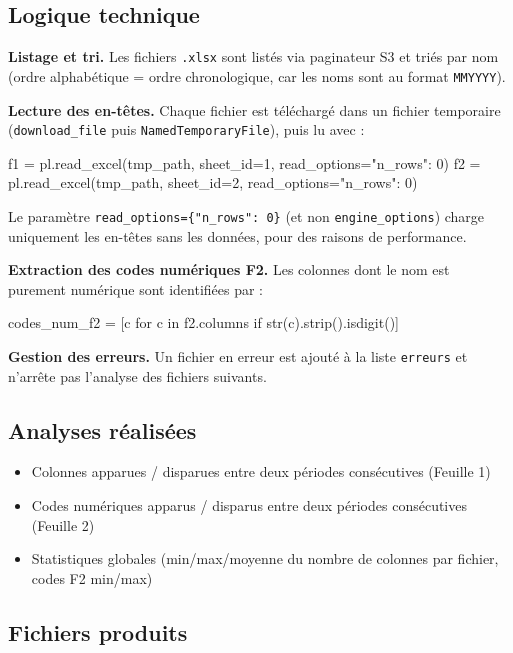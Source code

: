 \documentclass[12pt,a4paper,french]{report}
\begin{document}
\subsection{Logique technique}

\textbf{Listage et tri.} Les fichiers \texttt{.xlsx} sont listés via
paginateur S3 et triés par nom (ordre alphabétique = ordre chronologique,
car les noms sont au format \texttt{MMYYYY}).

\textbf{Lecture des en-têtes.} Chaque fichier est téléchargé dans un fichier
temporaire (\texttt{download\_file} puis \texttt{NamedTemporaryFile}), puis lu
avec :

\begin{codebox}[]
f1 = pl.read\_excel(tmp\_path, sheet\_id=1, read\_options={"n\_rows": 0})
f2 = pl.read\_excel(tmp\_path, sheet\_id=2, read\_options={"n\_rows": 0})
\end{codebox}

Le paramètre \texttt{read\_options=\{"n\_rows": 0\}} (et non
\texttt{engine\_options}) charge uniquement les en-têtes sans les données,
pour des raisons de performance.

\textbf{Extraction des codes numériques F2.} Les colonnes dont le nom est
purement numérique sont identifiées par :

\begin{codebox}[]
codes\_num\_f2 = [c for c in f2.columns if str(c).strip().isdigit()]
\end{codebox}

\textbf{Gestion des erreurs.} Un fichier en erreur est ajouté à la liste
\texttt{erreurs} et n'arrête pas l'analyse des fichiers suivants.

\subsection{Analyses réalisées}

\begin{itemize}
  \item Colonnes apparues / disparues entre deux périodes consécutives
        (Feuille 1)
  \item Codes numériques apparus / disparus entre deux périodes
        consécutives (Feuille 2)
  \item Statistiques globales (min/max/moyenne du nombre de colonnes par
        fichier, codes F2 min/max)
\end{itemize}

\subsection{Fichiers produits}
\end{document}
